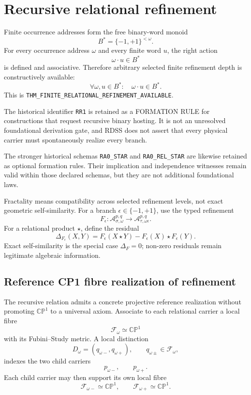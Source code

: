 \documentclass[11pt]{article}
\newcommand{\CP}{\mathbb{CP}^{1}}
\newcommand{\claimid}[1]{\nolinkurl{#1}}
\begin{document}
\section{Recursive relational refinement}

Finite occurrence addresses form the free binary-word monoid
\[
\boxed{
B^*=\{-1,+1\}^{<\omega}.
}
\]
For every occurrence address \(\omega\) and every finite word \(u\), the
right action
\[
\boxed{
\omega\cdot u\in B^*
}
\]
is defined and associative. Therefore arbitrary selected finite refinement
depth is constructively available:
\[
\boxed{
\forall\omega,u\in B^*:\quad \omega\cdot u\in B^*.
}
\]
This is
\claimid{THM_FINITE_RELATIONAL_REFINEMENT_AVAILABLE}.

The historical identifier \claimid{RR1} is retained as a FORMATION RULE for
constructions that request recursive binary hosting. It is not an unresolved
foundational derivation gate, and RDSS does not assert that every physical
carrier must spontaneously realize every branch.

The stronger historical schemas
\claimid{RA0_STAR} and \claimid{RA0_REL_STAR} are likewise retained as
optional formation rules. Their implication and independence witnesses remain
valid within those declared schemas, but they are not additional foundational
laws.

Fractality means compatibility across selected refinement levels, not exact
geometric self-similarity. For a branch
\(\epsilon\in\{-1,+1\}\), use the typed refinement
\[
\boxed{
F_{\epsilon}:
\mathcal A_{\sigma,\omega}^{p,q}
\to
\mathcal A_{\tau,\omega\epsilon}^{p,q}.
}
\]
For a relational product \(\star\), define the residual
\[
\boxed{
\Delta_{F_{\epsilon}}(X,Y)
=
F_{\epsilon}(X\star Y)
-
F_{\epsilon}(X)\star F_{\epsilon}(Y).
}
\]
Exact self-similarity is the special case \(\Delta_F=0\); non-zero
residuals remain legitimate algebraic information.

\subsection{Reference CP1 fibre realization of refinement}

The recursive relation admits a concrete projective reference realization
without promoting \(\CP\) to a universal axiom. Associate to each relational
carrier a local fibre
\[
\boxed{
\mathcal F_{\omega}\simeq\CP
}
\]
with its Fubini--Study metric. A local distinction
\[
D_{\omega}
=
\left(
q_{\omega-},q_{\omega+}
\right),
\qquad
q_{\omega\pm}\in\mathcal F_{\omega},
\]
indexes the two child carriers
\[
p_{\omega-},
\qquad
p_{\omega+}.
\]
Each child carrier may then support its own local fibre
\[
\mathcal F_{\omega-}\simeq\CP,
\qquad
\mathcal F_{\omega+}\simeq\CP.
\]
\end{document}
